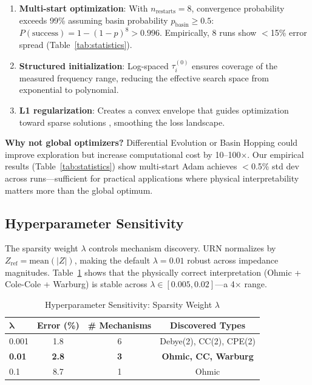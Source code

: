 \documentclass{ieeeaccess}
\begin{document}
\begin{enumerate}
\item \textbf{Multi-start optimization}: With $n_{\text{restarts}} = 8$, convergence probability exceeds 99\% assuming basin probability $p_{\text{basin}} \geq 0.5$: $P(\text{success}) = 1 - (1-p)^8 > 0.996$. Empirically, 8 runs show $<$15\% error spread (Table~\ref{tab:statistics}).

\item \textbf{Structured initialization}: Log-spaced $\tau_i^{(0)}$ ensures coverage of the measured frequency range, reducing the effective search space from exponential to polynomial.

\item \textbf{L1 regularization}: Creates a convex envelope that guides optimization toward sparse solutions \cite{tibshirani1996regression}, smoothing the loss landscape.
\end{enumerate}

\textbf{Why not global optimizers?} Differential Evolution or Basin Hopping could improve exploration but increase computational cost by 10--100$\times$. Our empirical results (Table~\ref{tab:statistics}) show multi-start Adam achieves $<$0.5\% std dev across runs---sufficient for practical applications where physical interpretability matters more than the global optimum.

\subsection{Hyperparameter Sensitivity}
\label{sec:sensitivity}

The sparsity weight $\lambda$ controls mechanism discovery. URN normalizes by $Z_{\text{ref}} = \text{mean}(|Z|)$, making the default $\lambda = 0.01$ robust across impedance magnitudes. Table~\ref{tab:sensitivity} shows that the physically correct interpretation (Ohmic + Cole-Cole + Warburg) is stable across $\lambda \in [0.005, 0.02]$---a 4$\times$ range.

\begin{table}[!t]
\caption{Hyperparameter Sensitivity: Sparsity Weight $\lambda$}
\label{tab:sensitivity}
\centering
\begin{tabular}{@{}lccc@{}}
\toprule
$\mathbf{\lambda}$ & \textbf{Error (\%)} & \textbf{\# Mechanisms} & \textbf{Discovered Types} \\
\midrule
0.001 & 1.8 & 6 & Debye(2), CC(2), CPE(2) \\
\textbf{0.01} & \textbf{2.8} & \textbf{3} & \textbf{Ohmic, CC, Warburg} \\
0.1 & 8.7 & 1 & Ohmic \\
\bottomrule
\end{tabular}
\end{table}
\end{document}
